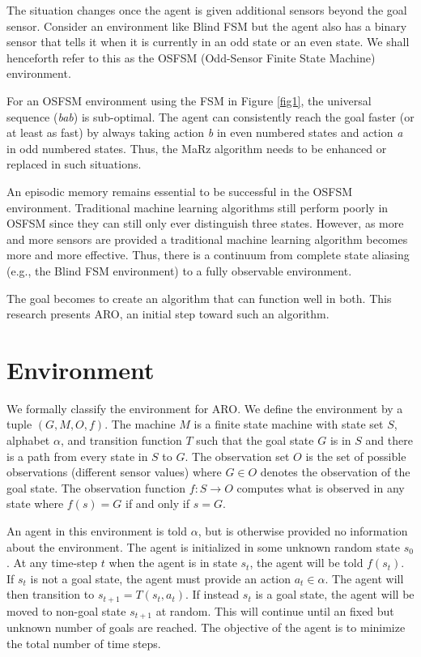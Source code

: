 \documentclass[letterpaper]{article} %
\begin{document}

The situation changes once the agent is given additional sensors
beyond the goal sensor.  Consider an environment like Blind FSM but
the agent also has a binary sensor that tells it when it is currently
in an odd state or an even state.  We shall henceforth refer to this
as the OSFSM (Odd-Sensor Finite State Machine) environment.

For an OSFSM environment using the FSM in Figure \ref{fig1}, the
universal sequence (\textit{bab}) is sub-optimal.  The agent can
consistently reach the goal faster (or at least as fast) by always
taking action \textit{b} in even numbered states and action \textit{a}
in odd numbered states.  Thus, the MaRz algorithm needs to be enhanced
or replaced in such situations.

An episodic memory remains essential to be successful in the OSFSM
environment.  Traditional machine learning algorithms still perform
poorly in OSFSM since they can still only ever distinguish three
states.  However, as more and more sensors are provided a traditional
machine learning algorithm becomes more and more effective.  Thus,
there is a continuum from complete state aliasing (e.g., the Blind FSM
environment) to a fully observable environment.

The goal becomes to create an algorithm that can function well in
both.  This research presents ARO, an initial step toward such an
algorithm.

\section{Environment}

We formally classify the environment for ARO. We define the environment by a tuple $(G, M, O, f)$. The machine $M$ is a finite state machine with state set $S$, alphabet $\alpha$, and transition function $T$ such that the goal state $G$ is in $S$ and there is a path from every state in $S$ to $G$. The observation set $O$ is the set of possible observations (different sensor values) where $G \in O$ denotes the observation of the goal state. The observation function $f: S \rightarrow O$ computes what is observed in any state where $f(s) = G$ if and only if $s = G$. 

An agent in this environment is told $\alpha$, but is otherwise provided no information about the environment. The agent is initialized in some unknown random state $s_0$. At any time-step $t$ when the agent is in state $s_t$, the agent will be told $f(s_t)$. If $s_t$ is not a goal state, the agent must provide an action $a_t \in \alpha$. The agent will then transition to $s_{t+1} = T(s_t, a_t)$. If instead $s_t$ is a goal state, the agent will be moved to non-goal state $s_{t+1}$ at random. This will continue until an fixed but unknown number of goals are reached. The objective of the agent is to minimize the total number of time steps.
\end{document}
